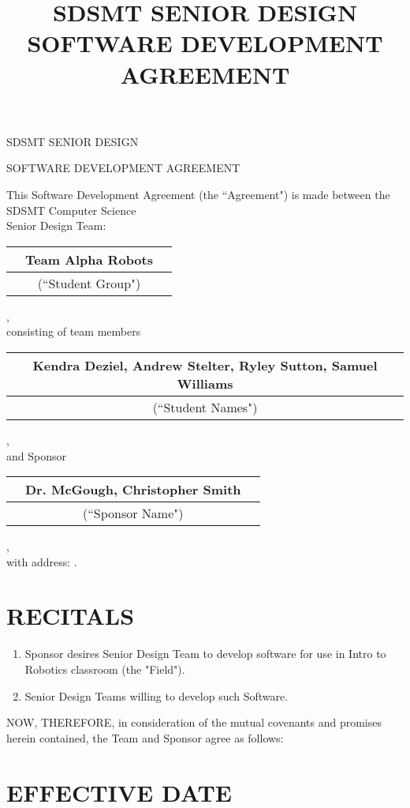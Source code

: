 \documentclass[11pt]{article}
\title{SDSMT SENIOR DESIGN SOFTWARE DEVELOPMENT AGREEMENT}
\begin{document}

{\Large \bf 
\centerline{SDSMT SENIOR DESIGN}\centerline{SOFTWARE DEVELOPMENT AGREEMENT}
}
\vspace{\baselineskip}

This Software Development Agreement (the ``Agreement") is made between the SDSMT  Computer Science\\[3mm]
Senior Design Team: 
\begin{tabularx}{\textwidth-}{X c X}
& Team Alpha Robots & \\ \hline
& {\footnotesize (``Student Group")} &
\end{tabularx},\\[3mm]
consisting of team members 
\begin{tabularx}{\textwidth-}{X c X}
& Kendra Deziel, Andrew Stelter, Ryley Sutton, Samuel Williams  & \\ \hline
& {\footnotesize (``Student Names")} &
\end{tabularx},\\[3mm]
and Sponsor
\begin{tabularx}{\textwidth-}{X c X}
& Dr. McGough, Christopher Smith  & \\ \hline
& {\footnotesize (``Sponsor Name")}
\end{tabularx},\\[3mm]
 with address: \hrulefill . 

\vspace{4mm}

\section{RECITALS}
\begin{enumerate}  \itemsep4pt \parskip0pt 
\item Sponsor desires Senior Design Team to develop software for use in Intro to Robotics classroom (the "Field").    

\item Senior Design Teams willing to develop such Software.  
\end{enumerate}
NOW, THEREFORE, in consideration of the mutual covenants and promises herein contained, the Team and Sponsor agree as follows:  

\section{EFFECTIVE DATE }
\end{document}
